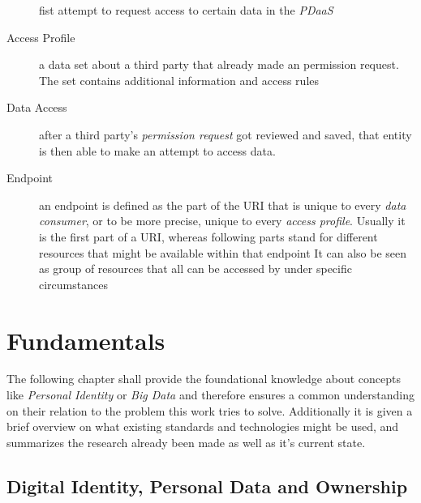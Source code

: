 \documentclass[12pt,english,a4paper,titlepage,cleardoublepage=empty,dottedtoc]{report}
\begin{document}
\begin{description}
fist attempt to request access to certain data in the \emph{PDaaS}
\item[Access Profile]
a data set about a third party that already made an permission request.
The set contains additional information and access rules
\item[Data Access]
after a third party's \emph{permission request} got reviewed and saved,
that entity is then able to make an attempt to access data.
\item[Endpoint]
an endpoint is defined as the part of the URI that is unique to every
\emph{data consumer}, or to be more precise, unique to every
\emph{access profile}. Usually it is the first part of a URI, whereas
following parts stand for different resources that might be available
within that endpoint It can also be seen as group of resources that all
can be accessed by under specific circumstances
\end{description}

\chapter{Fundamentals}\label{fundamentals}

The following chapter shall provide the foundational knowledge about
concepts like \emph{Personal Identity} or \emph{Big Data} and therefore
ensures a common understanding on their relation to the problem this
work tries to solve. Additionally it is given a brief overview on what
existing standards and technologies might be used, and summarizes the
research already been made as well as it's current state.

\hypertarget{digital-identity-personal-data-and-ownership}{\section{Digital
Identity, Personal Data and
Ownership}\label{digital-identity-personal-data-and-ownership}}
\end{document}
